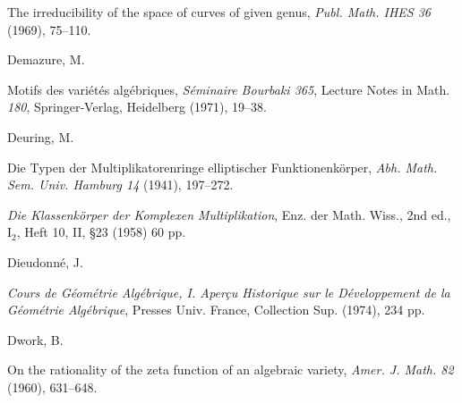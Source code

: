 {\noindent\hangindent=25bp\hspace*{6bp}%
The irreducibility of the space of curves of given genus, \emph{Publ. Math. IHES 36} (1969), 75--110.\par
\par\vspace{2.15pt}\noindent \hypertarget{bib-475-7}{}Demazure, M.\par
\noindent\hangindent=25bp\hspace*{6bp}%
Motifs des vari\'et\'es alg\'ebriques, \emph{S\'eminaire Bourbaki 365}, Lecture Notes in Math. \emph{180}, Springer-Verlag, Heidelberg (1971), 19--38.\par
\par\vspace{2.15pt}\noindent \hypertarget{bib-475-8}{}Deuring, M.\par
\noindent\hangindent=25bp\hspace*{6bp}%
Die Typen der Multiplikatorenringe elliptischer Funktionenk\"orper, \emph{Abh. Math. Sem. Univ. Hamburg 14} (1941), 197--272.\par
\noindent\hangindent=25bp\hspace*{6bp}%
\emph{Die Klassenk\"orper der Komplexen Multiplikation}, Enz. der Math. Wiss., 2nd ed., $\mathrm I_2$, Heft 10, II, \S23 (1958) 60 pp.\par
\par\vspace{2.15pt}\noindent \hypertarget{bib-475-10}{}Dieudonn\'e, J.\par
\noindent\hangindent=25bp\hspace*{6bp}%
\emph{Cours de G\'eom\'etrie Alg\'ebrique, I. Aper\c{c}u Historique sur le D\'eveloppement de la G\'eom\'etrie Alg\'ebrique}, Presses Univ. France, Collection Sup. (1974), 234 pp.\par
\par\vspace{2.15pt}\noindent \hypertarget{bib-475-11}{}Dwork, B.\par
\noindent\hangindent=25bp\hspace*{6bp}%
On the rationality of the zeta function of an algebraic variety, \emph{Amer. J. Math. 82} (1960), 631--648.\par
}

